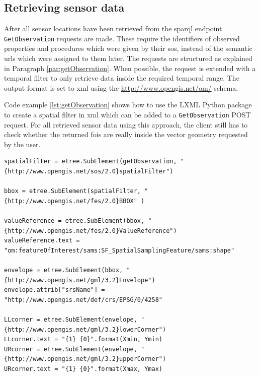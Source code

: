\subsection{Retrieving sensor data}
\begin{sloppypar}
After all sensor locations have been retrieved from the \ac{sparql} endpoint \texttt{GetObservation} requests are made. These require the identifiers of observed properties and procedures which were given by their \ac{sos}, instead of the semantic \acp{url} which were assigned to them later. The requests are structured as explained in Paragraph \ref{par:getObservation}. When possible, the request is extended with a temporal filter to only retrieve data inside the required temporal range. The output format is set to \ac{xml} using the \url{http://www.opengis.net/om/} schema.
\end{sloppypar}

Code example \ref{lst:getObservation} shows how to use the LXML Python package to create a spatial filter in \ac{xml} which can be added to a \texttt{GetObservation} POST request. For all retrieved sensor data using this approach, the client still has to check whether the returned \acp{foi} are really inside the vector geometry requested by the user. 

\begin{lstlisting}[float,caption={Script that creates an LXML graph object called spatialFilter to add to a \texttt{GetObservaton} POST request}, label={lst:getObservation}]
spatialFilter = etree.SubElement(getObservation, "{http://www.opengis.net/sos/2.0}spatialFilter")

bbox = etree.SubElement(spatialFilter, "{http://www.opengis.net/fes/2.0}BBOX" )

valueReference = etree.SubElement(bbox, "{http://www.opengis.net/fes/2.0}ValueReference")
valueReference.text = "om:featureOfInterest/sams:SF_SpatialSamplingFeature/sams:shape"

envelope = etree.SubElement(bbox, "{http://www.opengis.net/gml/3.2}Envelope")
envelope.attrib["srsName"] = "http://www.opengis.net/def/crs/EPSG/0/4258"

LLcorner = etree.SubElement(envelope, "{http://www.opengis.net/gml/3.2}lowerCorner")
LLcorner.text = "{1} {0}".format(Xmin, Ymin)
URcorner = etree.SubElement(envelope, "{http://www.opengis.net/gml/3.2}upperCorner")
URcorner.text = "{1} {0}".format(Xmax, Ymax)
\end{lstlisting}

